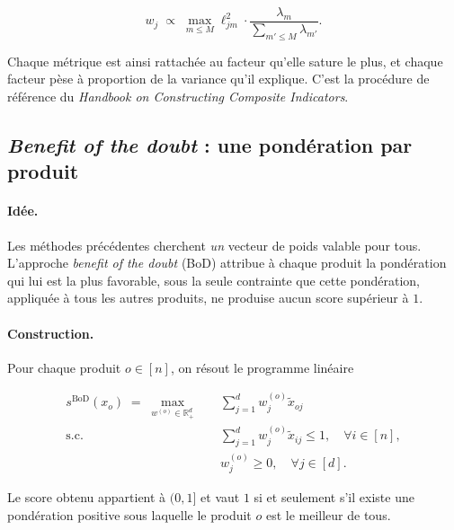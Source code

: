 \documentclass[11pt,a4paper]{article}
\theoremstyle{definition}
\theoremstyle{remark}
\newcommand{\R}{\mathbb{R}}
\begin{document}
\medskip

\[
w_j \;\propto\; \max_{m \le M} \ell_{jm}^2 \cdot \frac{\lambda_m}{\sum_{m'\le M}\lambda_{m'}} .
\]

\bigskip

Chaque métrique est ainsi rattachée au facteur qu'elle sature le plus, et chaque facteur pèse à
proportion de la variance qu'il explique. C'est la procédure de référence du \emph{Handbook on
Constructing Composite Indicators}.

\bigskip

\subsection{\emph{Benefit of the doubt} : une pondération par produit}
\label{sec:bod}

\paragraph{Idée.} Les méthodes précédentes cherchent \emph{un} vecteur de poids valable pour tous.
L'approche \emph{benefit of the doubt} (BoD) attribue à chaque produit la pondération qui lui est la
plus favorable, sous la seule contrainte que cette pondération, appliquée à tous les autres
produits, ne produise aucun score supérieur à $1$.

\paragraph{Construction.} Pour chaque produit $o \in [n]$, on résout le programme linéaire

\medskip

\[
\begin{aligned}
s^{\mathrm{BoD}}(x_o) \;=\; \max_{w^{(o)} \in \R^d_+} \quad & \sum_{j=1}^d w^{(o)}_j \tilde{x}_{oj} \\
\text{s.c.} \quad & \sum_{j=1}^d w^{(o)}_j \tilde{x}_{ij} \le 1, \quad \forall i \in [n], \\
& w^{(o)}_j \ge 0, \quad \forall j \in [d].
\end{aligned}
\tag{BoD}
\]

\bigskip

Le score obtenu appartient à $(0,1]$ et vaut $1$ si et seulement s'il existe une pondération
positive sous laquelle le produit $o$ est le meilleur de tous.

\bigskip
\end{document}
